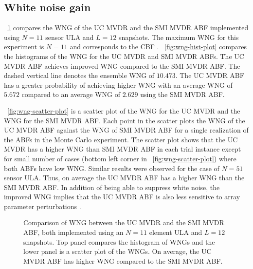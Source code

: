 \subsection{White noise gain}
\label{sec:ucmvdr-wng-result}
\figurename{}~\ref{fig:wng} compares the WNG of the UC MVDR and the
SMI MVDR ABF implemented using $N = 11$ sensor ULA and $L = 12$
snapshots. The maximum WNG for this experiment is $N = 11$ and
corresponds to the CBF
\cite{vtree2002oap}. \figurename{}~\ref{fig:wng-hist-plot} compares
the histograms of the WNG for the UC MVDR and SMI MVDR ABFs. The UC
MVDR ABF achieves improved WNG compared to the SMI MVDR ABF. The
dashed vertical line denotes the ensemble WNG of $10.473$. The UC MVDR
ABF has a greater probability of achieving higher WNG with an average
WNG of $5.672$ compared to an average WNG of $2.629$ using the SMI
MVDR ABF.

\figurename{}~\ref{fig:wng-scatter-plot} is a scatter plot of the WNG
for the UC MVDR and the WNG for the SMI MVDR ABF. Each point in the
scatter plots the WNG of the UC MVDR ABF against the WNG of SMI MVDR
ABF for a single realization of the ABFs in the Monte Carlo
experiment. The scatter plot shows that the UC MVDR has a higher WNG
than SMI MVDR ABF in each trial instance except for small number of
cases (bottom left corner in \figurename{}~\ref{fig:wng-scatter-plot})
where both ABFs have low WNG. Similar results were observed for the
case of $N = 51$ sensor ULA. Thus, on average the UC MVDR ABF has a
higher WNG than the SMI MVDR ABF. In addition of being able to
suppress white noise, the improved WNG implies that the UC MVDR ABF is
also less sensitive to array parameter perturbations
\cite{Gilbert1955,vtree2002oap}.


\begin{figure}[!hp]
  \centering

  \caption[Comparison of WNG between the UC MVDR and the SMI MVDR ABF,
    both implemented using an $N = 11$ element ULA]{Comparison of WNG between the UC MVDR and the SMI MVDR ABF,
    both implemented using an $N = 11$ element ULA and $L = 12$
    snapshots. Top panel compares the histogram of WNGs and the lower
    panel is a scatter plot of the WNGs. On average, the UC MVDR ABF
    has higher WNG compared to the SMI MVDR ABF. }
  \label{fig:wng}
\end{figure}

